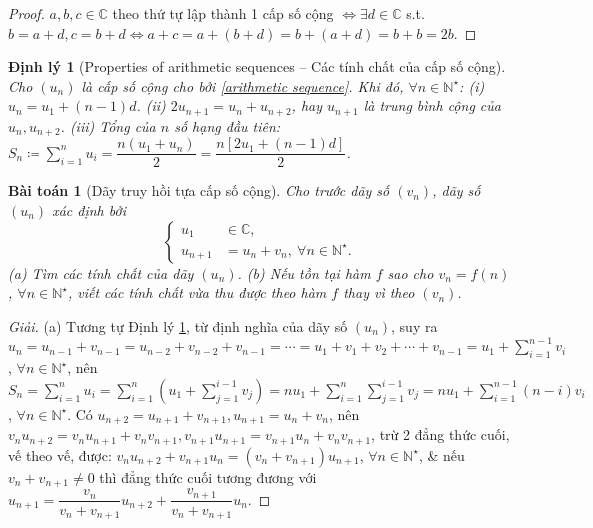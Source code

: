 \documentclass{article}
\newtheorem{baitoan}{Bài toán}
\newtheorem{dinhly}{Định lý}
\begin{document}
\begin{proof}
	$a,b,c\in\mathbb{C}$ theo thứ tự lập thành 1 cấp số cộng $\Leftrightarrow\exists d\in\mathbb{C}$ s.t. $b = a + d,c = b + d\Leftrightarrow a + c = a + (b + d) = b + (a + d) = b + b = 2b$.
\end{proof}

\begin{dinhly}[Properties of arithmetic sequences -- Các tính chất của cấp số cộng]
	\label{thm: properties of arithmetic sequences}
	Cho $(u_n)$ là cấp số cộng cho bởi \eqref{arithmetic sequence}. Khi đó, $\forall n\in\mathbb{N}^\star$: (i) $u_n = u_1 + (n - 1)d$. (ii) $2u_{n+1} = u_n + u_{n+2}$, hay $u_{n+1}$ là trung bình cộng của $u_n,u_{n+2}$. (iii) Tổng của $n$ số hạng đầu tiên: $S_n\coloneqq\sum_{i=1}^n u_i = \dfrac{n(u_1 + u_n)}{2} = \dfrac{n[2u_1 + (n - 1)d]}{2}$.
\end{dinhly}

\begin{baitoan}[Dãy truy hồi tựa cấp số cộng]
	Cho trước dãy số $(v_n)$, dãy số $(u_n)$ xác định bởi
	\begin{equation*}
		\left\{\begin{split}
			u_1&\in\mathbb{C},\\
			u_{n+1} &= u_n + v_n,\ \forall n\in\mathbb{N}^\star.
		\end{split}\right.
	\end{equation*}
	(a) Tìm các tính chất của dãy $(u_n)$. (b) Nếu tồn tại hàm $f$ sao cho $v_n = f(n)$, $\forall n\in\mathbb{N}^\star$, viết các tính chất vừa thu được theo hàm $f$ thay vì theo $(v_n)$.
\end{baitoan}

\begin{proof}[Giải]
	(a) Tương tự Định lý \ref{thm: properties of arithmetic sequences}, từ định nghĩa của dãy số $(u_n)$, suy ra $u_n = u_{n-1} + v_{n-1} = u_{n-2} + v_{n-2} + v_{n-1} = \cdots = u_1 + v_1 + v_2 + \cdots + v_{n-1} = u_1 + \sum_{i=1}^{n-1} v_i$, $\forall n\in\mathbb{N}^\star$, nên $S_n = \sum_{i=1}^n u_i = \sum_{i=1}^n \left(u_1 + \sum_{j=1}^{i-1} v_j\right) = nu_1 + \sum_{i=1}^n\sum_{j=1}^{i-1} v_j = nu_1 + \sum_{i=1}^{n-1} (n - i)v_i$, $\forall n\in\mathbb{N}^\star$. Có $u_{n+2} = u_{n+1} + v_{n+1},u_{n+1} = u_n + v_n$, nên $v_nu_{n+2} = v_nu_{n+1} + v_nv_{n+1},v_{n+1}u_{n+1} = v_{n+1}u_n + v_nv_{n+1}$, trừ 2 đẳng thức cuối, vế theo vế, được: $v_nu_{n+2} + v_{n+1}u_n = (v_n + v_{n+1})u_{n+1}$, $\forall n\in\mathbb{N}^\star$, \& nếu $v_n + v_{n+1}\ne0$ thì đẳng thức cuối tương đương với $u_{n+1} = \dfrac{v_n}{v_n + v_{n+1}}u_{n+2} + \dfrac{v_{n+1}}{v_n + v_{n+1}}u_n$.
\end{proof}
\end{document}
